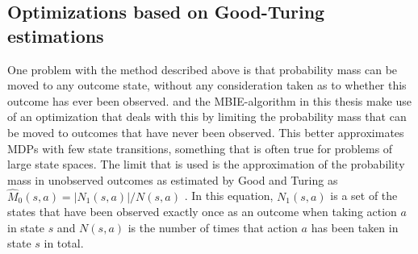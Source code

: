 \subsection{Optimizations based on Good-Turing estimations}

\label{sec:mbie_gt}

One problem with the method described above is that probability mass can be
moved to any outcome state, without any consideration taken as to whether this
outcome has ever been observed. \textcite{dietterich2013pac} and the 
MBIE-algorithm in this thesis make use of an optimization that deals with this by 
limiting the probability mass that can be moved to outcomes that have never been 
observed. This better approximates MDPs with few state transitions, something 
that is often true for problems of large state spaces. The limit that is used is the 
approximation of the probability mass in unobserved outcomes as estimated by 
Good and Turing as $\hat{M}_0(s,a) = |N_1(s,a)| / N(s,a)$ \parencite{gtpaper}. 
In this equation, $N_1(s,a)$ is a set of the states that have been observed exactly
once as an outcome when taking action $a$ in state $s$ and $N(s,a)$ is the
number of times that action $a$ has been taken in state $s$ in total. 